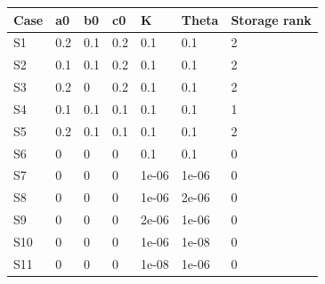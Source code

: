 \begin{tabular}{lllllll}
\hline
Case & a0 & b0 & c0 & K & Theta & Storage rank \\
\hline
S1 & 0.2 & 0.1 & 0.2 & 0.1 & 0.1 & 2 \\
S2 & 0.1 & 0.1 & 0.2 & 0.1 & 0.1 & 2 \\
S3 & 0.2 & 0 & 0.2 & 0.1 & 0.1 & 2 \\
S4 & 0.1 & 0.1 & 0.1 & 0.1 & 0.1 & 1 \\
S5 & 0.2 & 0.1 & 0.1 & 0.1 & 0.1 & 2 \\
S6 & 0 & 0 & 0 & 0.1 & 0.1 & 0 \\
S7 & 0 & 0 & 0 & 1e-06 & 1e-06 & 0 \\
S8 & 0 & 0 & 0 & 1e-06 & 2e-06 & 0 \\
S9 & 0 & 0 & 0 & 2e-06 & 1e-06 & 0 \\
S10 & 0 & 0 & 0 & 1e-06 & 1e-08 & 0 \\
S11 & 0 & 0 & 0 & 1e-08 & 1e-06 & 0 \\
\hline
\end{tabular}
